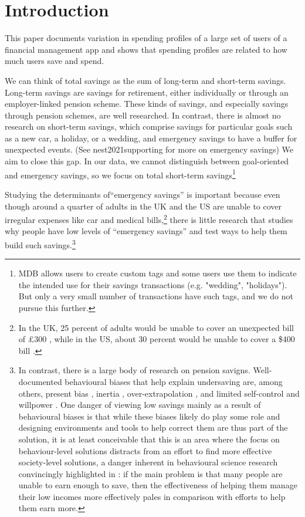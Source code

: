 
\section{Introduction}%
\label{sec:introduction}

This paper documents variation in spending profiles of a large set of users of
a financial management app and shows that spending profiles are related to how
much users save and spend.

We can think of total savings as the sum of long-term and short-term savings.
Long-term savings are savings for retirement, either individually or through an
employer-linked pension scheme. These kinds of savings, and especially savings
through pension schemes, are well researched. In contrast, there is almost no
research on short-term savings, which comprise savings for particular goals
such as a new car, a holiday, or a wedding, and emergency savings to have a
buffer for unexpected events. (See nest2021supporting for more on emergency
savings) We aim to close this gap. In our data, we cannot distinguish between
goal-oriented and emergency savings, so we focus on total short-term
savings\footnote{MDB allows users to create custom tags and some users use them
to indicate the intended use for their savings transactions (e.g. "wedding",
"holidays"). But only a very small number of transactions have such tags, and
we do not pursue this further.}

Studying the determinants of``emergency savings'' is important because even
though around a quarter of adults in the UK and the US are unable to cover
irregular expenses like car and medical bills,\footnote{In the UK, 25 percent
    of adults would be unable to cover an unexpected bill of \pounds300
\citep{philipps2021supporting}, while in the US, about 30 percent would be
unable to cover a \$400 bill \citep{fed2022economic}.} there is little research
that studies why people have low levels of ``emergency savings'' and test ways
to help them build such savings.\footnote{In contrast, there is a large body of
    research on pension savigns.  Well-documented behavioural biases that help
    explain undersaving are, among others, present bias
    \citep{laibson1997golden, laibson2019intertemporal}, inertia
    \citep{madrian2001power}, over-extrapolation \citep{choi2009reinforcement},
    and limited self-control and willpower \citep{thaler1981economic,
    benhabib2005modeling, fudenberg2006dual, loewenstein2004animal,
gul2001temptation}. One danger of viewing low savings mainly as a result of
behavioural biases is that while these biases likely do play some role and
designing environments and tools to help correct them are thus part of the
solution, it is at least conceivable that this is an area where the focus on
behaviour-level solutions distracts from an effort to find more effective
society-level solutions, a danger inherent in behavioural science research
convincingly highlighted in \citet{chater2022frame}: if the main problem is
that many people are unable to earn enough to save, then the effectiveness of
helping them manage their low incomes more effectively pales in comparison with
efforts to help them earn more.}

